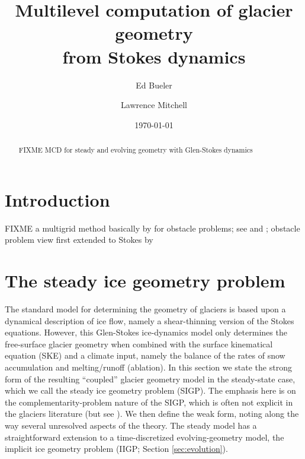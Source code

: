 \documentclass[letterpaper,final,12pt,reqno]{amsart}
\theoremstyle{claim}
\numberwithin{equation}{section}
\numberwithin{figure}{section}
\numberwithin{table}{section}
\numberwithin{theorem}{section}
\begin{document}
\title[Multilevel computation of glacier geometry from Stokes dynamics]{Multilevel computation of glacier geometry \\ from Stokes dynamics}

\author{Ed Bueler}

\author{Lawrence Mitchell}

\date{\today}

\begin{abstract} FIXME MCD for steady and evolving geometry with Glen-Stokes dynamics
\end{abstract}

\maketitle


\thispagestyle{empty}

\section{Introduction} \label{sec:intro}

FIXME a multigrid \cite{Trottenbergetal2001} method basically by \cite{Tai2003} for obstacle problems; see \cite{Bueler2022} and \cite{GraeserKornhuber2009};  obstacle problem view first extended to Stokes by \cite{WirbelJarosch2020}


\section{The steady ice geometry problem} \label{sec:stokesgeometry}

The standard model for determining the geometry of glaciers is based upon a dynamical description of ice flow, namely a shear-thinning version of the Stokes equations.  However, this Glen-Stokes ice-dynamics model only determines the free-surface glacier geometry when combined with the surface kinematical equation (SKE) and a climate input, namely the balance of the rates of snow accumulation and melting/runoff (ablation).  In this section we state the strong form of the resulting ``coupled'' glacier geometry model in the steady-state case, which we call the steady ice geometry problem (SIGP).  The emphasis here is on the complementarity-problem nature of the SIGP, which is often not explicit in the glaciers literature (but see \cite{SchoofHewitt2013}).  We then define the weak form, noting along the way several unresolved aspects of the theory.  The steady model has a straightforward extension to a time-discretized evolving-geometry model, the implicit ice geometry problem (IIGP; Section \ref{sec:evolution}).
\end{document}
